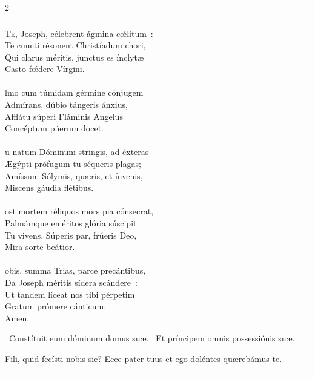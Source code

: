 \documentclass[9pt,twoside]{extarticle}
\begin{document}
\begin{multicols}{2}
{{{\subsubsection*{\center {}}
\lettrine{T}e, Joseph, célebrent ágmina cœ́litum~:\\
Te cuncti résonent Christíadum chori,\\
Qui clarus méritis, junctus es ínclytæ\\
Casto fœ́dere Vírgini.\\
\\
lmo cum túmidam gérmine cónjugem\\
Admírans, dúbio tángeris ánxius,\\
Afflátu súperi Fláminis Angelus\\
Concéptum púerum docet.\\
\\
u natum Dóminum stringis, ad éxteras\\
Ægýpti prófugum tu séqueris plagas;\\
Amíssum Sólymis, quæris, et ínvenis,\\
Miscens gáudia flétibus.\\
\\
ost mortem réliquos mors pia cónsecrat,\\
Palmámque eméritos glória súscipit~:\\
Tu vivens, Súperis par, frúeris Deo,\\
Mira sorte beátior.\\
\\
obis, summa Trias, parce precántibus,\\
Da Joseph méritis sídera scándere~:\\
Ut tandem líceat nos tibi pérpetim\\
Gratum prómere cánticum.\\
Amen.

\begin{tightlist}{}
\item {}~Constítuit eum dóminum domus suæ. ~Et príncipem omnis possessiónis suæ.
\item {} Fili, quid fecísti nobis sic? Ecce pater tuus et ego doléntes quærebámus te.
\end{tightlist}

\begin{center}\textcolor{red}{\rule{\linewidth}{0.5pt}} \end{center}

}}}
\end{multicols}
\end{document}
